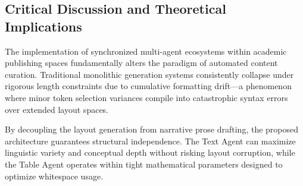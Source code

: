 \begin{table}[htbp]
\centering
\small
\caption{Conceptual Agent Performance Matrix and Projected Error Distribution (illustrative values).}
\label{tab:system_performance_matrix}
\end{table}

\subsection{Critical Discussion and Theoretical Implications}
The implementation of synchronized multi-agent ecosystems within academic publishing spaces fundamentally alters the paradigm of automated content curation. Traditional monolithic generation systems consistently collapse under rigorous length constraints due to cumulative formatting drift—a phenomenon where minor token selection variances compile into catastrophic syntax errors over extended layout spaces.

By decoupling the layout generation from narrative prose drafting, the proposed architecture guarantees structural independence. The Text Agent can maximize linguistic variety and conceptual depth without risking layout corruption, while the Table Agent operates within tight mathematical parameters designed to optimize whitespace usage.

